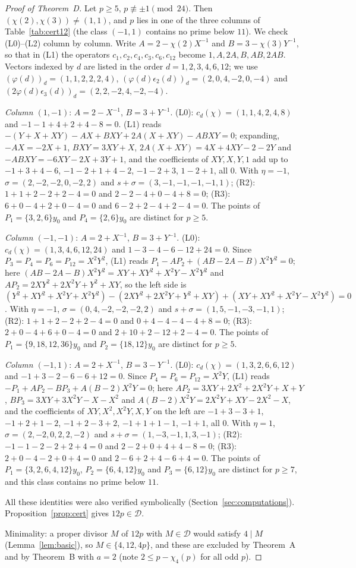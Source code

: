 \documentclass[11pt,a4paper]{article}
\theoremstyle{definition}
\theoremstyle{remark}
\newcommand{\cD}{\mathcal{D}}
\begin{document}
\begin{proof}[Proof of Theorem~D]
Let $p\ge5$, $p\not\equiv\pm1\pmod{24}$. Then $(\chi(2),\chi(3))\neq(1,1)$, and $p$ lies in one of the three columns of Table~\ref{tab:cert12} (the class $(-1,1)$ contains no prime below $11$). We check (L0)--(L2) column by column. Write $A=2-\chi(2)X^{-1}$ and $B=3-\chi(3)Y^{-1}$, so that in (L1) the operators $c_1,c_2,c_4,c_3,c_6,c_{12}$ become $1,A,2A,B,AB,2AB$. Vectors indexed by $d$ are listed in the order $d=1,2,3,4,6,12$; we use $(\varphi(d))_d=(1,1,2,2,2,4)$, $(\varphi(d)\epsilon_2(d))_d=(2,0,4,-2,0,-4)$ and $(2\varphi(d)\epsilon_3(d))_d=(2,2,-2,4,-2,-4)$.

\emph{Column $(1,-1)$}: $A=2-X^{-1}$, $B=3+Y^{-1}$. (L0): $c_d(\chi)=(1,1,4,2,4,8)$ and $-1-1+4+2+4-8=0$. (L1) reads $-(Y+X+XY)-AX+BXY+2A(X+XY)-ABXY=0$; expanding, $-AX=-2X+1$, $BXY=3XY+X$, $2A(X+XY)=4X+4XY-2-2Y$ and $-ABXY=-6XY-2X+3Y+1$, and the coefficients of $XY,X,Y,1$ add up to $-1+3+4-6$, $-1-2+1+4-2$, $-1-2+3$, $1-2+1$, all $0$. With $\eta=-1$, $\sigma=(2,-2,-2,0,-2,2)$ and $s+\sigma=(3,-1,-1,-1,-1,1)$; (R2): $1+1+2-2+2-4=0$ and $2-2-4+0-4+8=0$; (R3): $6+0-4+2+0-4=0$ and $6-2+2-4+2-4=0$. The points of $P_1=\{3,2,6\}y_0$ and $P_4=\{2,6\}y_0$ are distinct for $p\ge5$.

\emph{Column $(-1,-1)$}: $A=2+X^{-1}$, $B=3+Y^{-1}$. (L0): $c_d(\chi)=(1,3,4,6,12,24)$ and $1-3-4-6-12+24=0$. Since $P_3=P_4=P_6=P_{12}=X^2Y^2$, (L1) reads $P_1-AP_2+(AB-2A-B)X^2Y^2=0$; here $(AB-2A-B)X^2Y^2=XY+XY^2+X^2Y-X^2Y^2$ and $AP_2=2XY^2+2X^2Y+Y^2+XY$, so the left side is $(Y^2+XY^2+X^2Y+X^2Y^2)-(2XY^2+2X^2Y+Y^2+XY)+(XY+XY^2+X^2Y-X^2Y^2)=0$. With $\eta=-1$, $\sigma=(0,4,-2,-2,-2,2)$ and $s+\sigma=(1,5,-1,-3,-1,1)$; (R2): $1+1+2-2+2-4=0$ and $0+4-4-4-4+8=0$; (R3): $2+0-4+6+0-4=0$ and $2+10+2-12+2-4=0$. The points of $P_1=\{9,18,12,36\}y_0$ and $P_2=\{18,12\}y_0$ are distinct for $p\ge5$.

\emph{Column $(-1,1)$}: $A=2+X^{-1}$, $B=3-Y^{-1}$. (L0): $c_d(\chi)=(1,3,2,6,6,12)$ and $-1+3-2-6-6+12=0$. Since $P_4=P_6=P_{12}=X^2Y$, (L1) reads $-P_1+AP_2-BP_3+A(B-2)X^2Y=0$; here $AP_2=3XY+2X^2+2X^2Y+X+Y$, $BP_3=3XY+3X^2Y-X-X^2$ and $A(B-2)X^2Y=2X^2Y+XY-2X^2-X$, and the coefficients of $XY,X^2,X^2Y,X,Y$ on the left are $-1+3-3+1$, $-1+2+1-2$, $-1+2-3+2$, $-1+1+1-1$, $-1+1$, all $0$. With $\eta=1$, $\sigma=(2,-2,0,2,2,-2)$ and $s+\sigma=(1,-3,-1,1,3,-1)$; (R2): $-1-1-2-2+2+4=0$ and $2-2+0+4+4-8=0$; (R3): $2+0-4-2+0+4=0$ and $2-6+2+4-6+4=0$. The points of $P_1=\{3,2,6,4,12\}y_0$, $P_2=\{6,4,12\}y_0$ and $P_3=\{6,12\}y_0$ are distinct for $p\ge7$, and this class contains no prime below $11$.

All these identities were also verified symbolically (Section~\ref{sec:computations}). Proposition~\ref{prop:cert} gives $12p\in\cD$.

Minimality: a proper divisor $M$ of $12p$ with $M\in\cD$ would satisfy $4\mid M$ (Lemma~\ref{lem:basic}), so $M\in\{4,12,4p\}$, and these are excluded by Theorem~A and by Theorem~B with $a=2$ (note $2\le p-\chi_4(p)$ for all odd $p$).
\end{proof}
\end{document}
